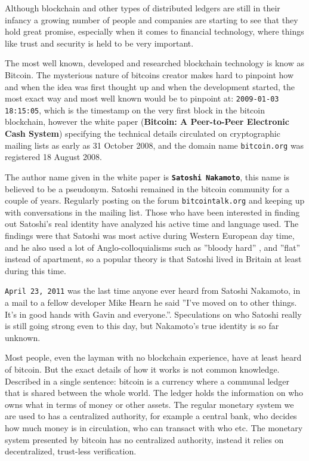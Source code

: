 
Although blockchain and other types of distributed ledgers are still in their infancy a growing number of people and companies are starting to see that they hold great promise, especially when it comes to financial technology, where things like trust and security is held to be very important. 

The most well known, developed and researched blockchain technology is know as Bitcoin. The mysterious nature of bitcoins creator makes hard to pinpoint how and when the idea was first thought up and when the development started, the most exact way and most well known would be to pinpoint at: \texttt{2009-01-03 18:15:05}\cite{genesis}, which is the timestamp on the very first block in the bitcoin blockchain, however the white paper (\textbf{Bitcoin: A Peer-to-Peer Electronic Cash System})\cite{nakamoto_bitcoin} specifying the technical details circulated on cryptographic mailing lists as early as 31 October 2008, and the domain name \texttt{bitcoin.org} was registered 18 August 2008.\cite{bernard_2018}


The author name given in the white paper is \textbf{\texttt{Satoshi Nakamoto}}, this name is believed to be a pseudonym. Satoshi remained in the bitcoin community for a couple of years. Regularly posting on the forum \texttt{bitcointalk.org} and keeping up with conversations in the mailing list. Those who have been interested in finding out Satoshi's real identity have analyzed his active time and language used. The findings were that Satoshi was most active during Western European day time, and he also used a lot of Anglo-colloquialisms such as ''bloody hard'' \cite{nakamoto_bloody}, and ''flat'' instead of apartment, so a popular theory is that Satoshi lived in Britain at least during this time.\cite{bernard_2018}

\texttt{April 23, 2011} was the last time anyone ever heard from Satoshi Nakamoto, in a mail to a fellow developer Mike Hearn he said ''I've moved on to other things.  It's in good hands with Gavin and everyone.''.\cite{nakamoto_last_mail} Speculations on who Satoshi really is still going strong even to this day, but Nakamoto's true identity is so far unknown.\cite{bernard_2018}\cite{jeffries_2013}

Most people, even the layman with no blockchain experience, have at least heard of bitcoin. But the exact details of how it works is not common knowledge. Described in a single sentence: bitcoin is a currency where a communal ledger that is shared between the whole world. The ledger holds the information on who owns what in terms of money or other assets. The regular monetary system we are used to has a centralized authority, for example a central bank, who decides how much money is in circulation, who can transact with who etc. The monetary system presented by bitcoin has no centralized authority, instead it relies on decentralized, trust-less verification.

